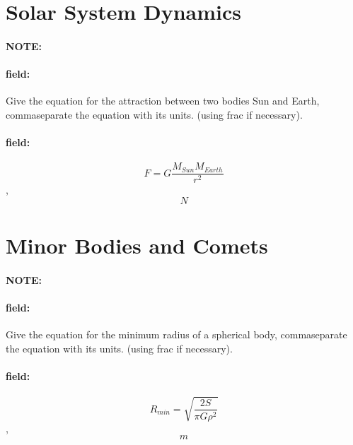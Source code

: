 \documentclass[12pt]{article}
\newenvironment{note}{\paragraph{NOTE:}}{}
\newenvironment{field}{\paragraph{field:}}{}
\begin{document}
\section{Solar System Dynamics}
\begin{note}
   \begin{field}
       Give the equation for the attraction between two bodies Sun and Earth, commaseparate the equation with its units. (using frac if necessary).
   \end{field}
   \begin{field}
		\[
			F=G\frac{M_{Sun}M_{Earth}}{r^2}
		\],
		\[
			N
		\]
   \end{field}
\end{note}
\section{Minor Bodies and Comets}
\begin{note}
   \begin{field}
       Give the equation for the minimum radius of a spherical body, commaseparate the equation with its units. (using frac if necessary).
   \end{field}
   \begin{field}
		\[
			R_{min}=\sqrt{\frac{2S}{\pi G \rho^2}}
		\],
		\[
			m
		\]
   \end{field}
\end{note}
\end{document}
